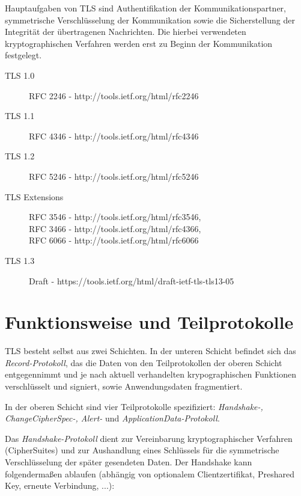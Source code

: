 \documentclass[
    12pt,
    headings=small,
    parskip=half,           %
    bibliography=totoc,
    numbers=noenddot,       %
    open=any,               %
    ]{scrreprt}
\begin{document}
Hauptaufgaben von TLS sind Authentifikation der Kommunikationspartner, symmetrische Verschlüsselung der Kommunikation sowie die Sicherstellung der Integrität der übertragenen Nachrichten. Die hierbei verwendeten kryptographischen Verfahren werden erst zu Beginn der Kommunikation festgelegt. 
\cite{eckert13}

\begin{description}
	\item[TLS 1.0] RFC 2246 - http://tools.ietf.org/html/rfc2246
	\item[TLS 1.1] RFC 4346 - http://tools.ietf.org/html/rfc4346
	\item[TLS 1.2] RFC 5246 - http://tools.ietf.org/html/rfc5246
	\item[TLS Extensions] RFC 3546 - http://tools.ietf.org/html/rfc3546, \\
RFC 3466 - http://tools.ietf.org/html/rfc4366, \\
RFC 6066 - http://tools.ietf.org/html/rfc6066
	\item[TLS 1.3] Draft - https://tools.ietf.org/html/draft-ietf-tls-tls13-05
\end{description}

\chapter{Funktionsweise und Teilprotokolle}


TLS besteht selbst aus zwei Schichten. In der unteren Schicht befindet sich das \emph{Record-Protokoll}, das die Daten von den Teilprotokollen der oberen Schicht entgegennimmt und je nach aktuell verhandelten krypographischen Funktionen verschlüsselt und signiert, sowie Anwendungsdaten fragmentiert. 

In der oberen Schicht sind vier Teilprotokolle spezifiziert: \emph{Handshake-, ChangeCipherSpec-, Alert-} und \emph{ApplicationData-Protokoll}.

Das \emph{Handshake-Protokoll} dient zur Vereinbarung kryptographischer Verfahren (CipherSuites) und zur Aushandlung eines Schlüssels für die symmetrische Verschlüsselung der später gesendeten Daten. Der Handshake kann folgendermaßen ablaufen (abhängig von optionalem Clientzertifikat, Preshared Key, erneute Verbindung, ...): 
\end{document}
